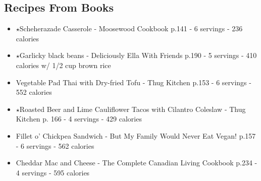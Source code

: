 \subsection*{Recipes From Books}
\begin{itemize}
    \item $\star$Scheherazade Casserole - Moosewood Cookbook p.141 - 6 servings - 236 calories
    \item $\star$Garlicky black beans - Deliciously Ella With Friends p.190 - 5 servings - 410 calories w/ 1/2 cup brown rice
    \item Vegetable Pad Thai with Dry-fried Tofu - Thug Kitchen p.153 - 6 servings - 552 calories
    \item $\star$Roasted Beer and Lime Cauliflower Tacos with Cilantro Coleslaw - Thug Kitchen p. 166 - 4 servings - 429 calories
    \item Fillet o' Chickpea Sandwich - But My Family Would Never Eat Vegan! p.157 - 6 servings - 562 calories
    \item Cheddar Mac and Cheese - The Complete Canadian Living Cookbook p.234 - 4 servings - 595 calories
\end{itemize}